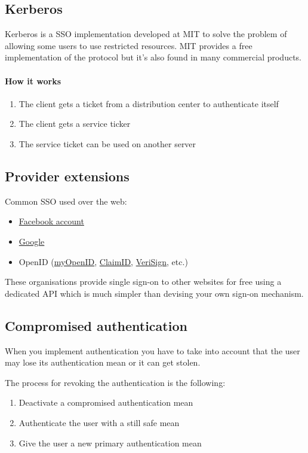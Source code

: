 \subsection{Kerberos}
Kerberos is a SSO implementation developed at MIT to solve the problem of
allowing some users to use restricted resources. MIT provides a free
implementation of the protocol but it's also found in many commercial
products.

\paragraph{How it works}
\begin{enumerate}
\item The client gets a ticket from a distribution center to authenticate itself
\item The client gets a service ticker
\item The service ticket can be used on another server
\end{enumerate}

\subsection{Provider extensions}
Common SSO used over the web:
\begin{itemize}
\item \href{http://www.facebook.com/}{Facebook account}
\item \href{http://google.com/}{Google}
\item OpenID (\href{http://myopenid.com/}{myOpenID},
\href{http://claimid.com/}{ClaimID},
\href{http://pip.verisignlabs.com/}{VeriSign}, etc.)
\end{itemize}
These organisations provide single sign-on to other websites for free
using a dedicated API which is much simpler than devising your own
sign-on mechanism.

\subsection{Compromised authentication}
When you implement authentication you have to take into account that the user
may lose its authentication mean or it can get stolen.

The process for revoking the authentication is the following:
\begin{enumerate}
\item Deactivate a compromised authentication mean
\item Authenticate the user with a still safe mean
\item Give the user a new primary authentication mean
\end{enumerate}

